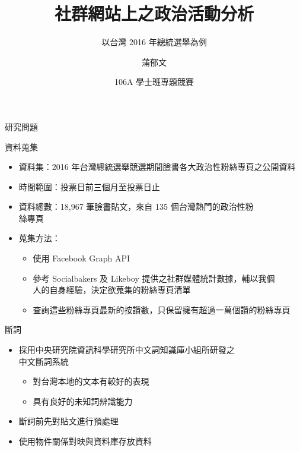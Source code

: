 \documentclass{beamer}
\title[Analysis of Political Activities on SNS]{社群網站上之政治活動分析}
\subtitle{以台灣 2016 年總統選舉為例}
\author[Yu Wen Pwu]{蒲郁文}
\institute[NCTU]{國立交通大學資訊工程學系}
\date[Undergraduate Research]{106A 學士班專題競賽}
\begin{document}
\begin{CJK}{UTF8}{bkai}

\begin{frame}
  \titlepage
\end{frame}

\begin{frame}
\end{frame}

\begin{frame}{研究問題}
  \tableofcontents
\end{frame}

\begin{frame}{資料蒐集}
\begin{itemize}
\item 資料集：2016 年台灣總統選舉競選期間臉書各大政治性粉絲專頁之公開資料
\item 時間範圍：投票日前三個月至投票日止
\item 資料總數：18,967 筆臉書貼文，來自 135 個台灣熱門的政治性粉\\絲專頁
\item 蒐集方法：
  \begin{itemize}
  \item 使用 Facebook Graph API
  \item 參考 Socialbakers 及 Likeboy 提供之社群媒體統計數據，輔以我個\\人的自身經驗，決定欲蒐集的粉絲專頁清單
  \item 查詢這些粉絲專頁最新的按讚數，只保留擁有超過一萬個讚的粉絲專頁
  \end{itemize}
\end{itemize}
\end{frame}

\begin{frame}{斷詞}
\begin{itemize}
\item 採用中央研究院資訊科學研究所中文詞知識庫小組所研發之\\中文斷詞系統
  \begin{itemize}
  \item 對台灣本地的文本有較好的表現
  \item 具有良好的未知詞辨識能力
  \end{itemize}
\item 斷詞前先對貼文進行預處理
\item 使用物件關係對映與資料庫存放資料
\end{itemize}
\end{frame}


\end{CJK}
\end{document}
